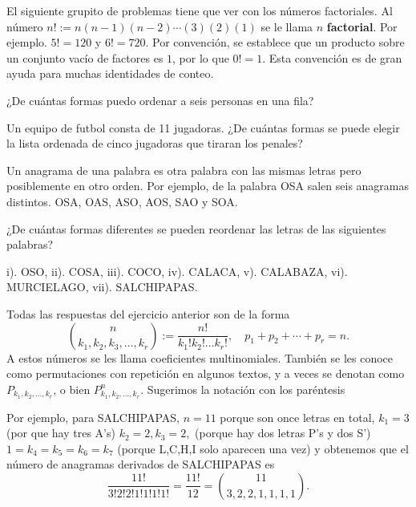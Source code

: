 El siguiente grupito de problemas tiene que ver con los números factoriales. Al número $n!:=n(n-1)(n-2)\cdots (3)(2)(1)$ se le llama $n$ {\bf factorial}. Por ejemplo. $5!=120$ y $6!=720$. Por convención, se establece que un producto sobre un conjunto vacío de factores es $1$, por lo que $0!=1$. Esta convención es de gran ayuda para muchas identidades de conteo.

\begin{ejercicio}
¿De cuántas formas puedo ordenar a seis personas en una fila?
\end{ejercicio}
\vspace{4cm}


\begin{ejercicio}
Un equipo de futbol consta de 11 jugadoras. ¿De cuántas formas se puede elegir la lista ordenada de cinco jugadoras que tiraran los penales?
\end{ejercicio}
\vspace{4cm}

Un anagrama de una palabra es otra palabra con las mismas letras pero posiblemente en otro orden. Por ejemplo, de la palabra OSA salen seis anagramas distintos. OSA, OAS, ASO, AOS, SAO y SOA.

\begin{ejercicio}
¿De cuántas formas diferentes se pueden reordenar las letras de las siguientes palabras? 

i). OSO, ii). COSA, iii). COCO, iv). CALACA, v). CALABAZA, vi). MURCIELAGO, vii). SALCHIPAPAS.
\end{ejercicio}


Todas las respuestas del ejercicio anterior son de la forma $${n\choose k_1, k_2, k_3,\dots, k_r}:= \frac{n!}{k_1!k_2!\dots k_r!},\quad  p_1+p_2+\cdots +p_r = n.$$ A estos números se les llama coeficientes multinomiales. También se les conoce como permutaciones con repetición en algunos textos, y a veces se denotan como  $P _{k_1,k_2,\dots, k_r}$, o bien $P^n_{k_1,k_2,\dots, k_r}$. Sugerimos la notación con los paréntesis

Por ejemplo, para SALCHIPAPAS, $n=11$ porque son once letras en total, $k_1 = 3$ (por que hay  tres A's) $k_2=2, k_3=2,$ (porque hay dos letras P's y dos S') $1=k_4=k_5=k_6=k_7$ (porque L,C,H,I solo aparecen una vez) y obtenemos que el número de anagramas derivados de SALCHIPAPAS es $$\frac{11!}{3!2!2!1!1!1!1!}=\frac{11!}{12} = {11\choose 3, 2, 2, 1, 1, 1, 1}.$$ 


